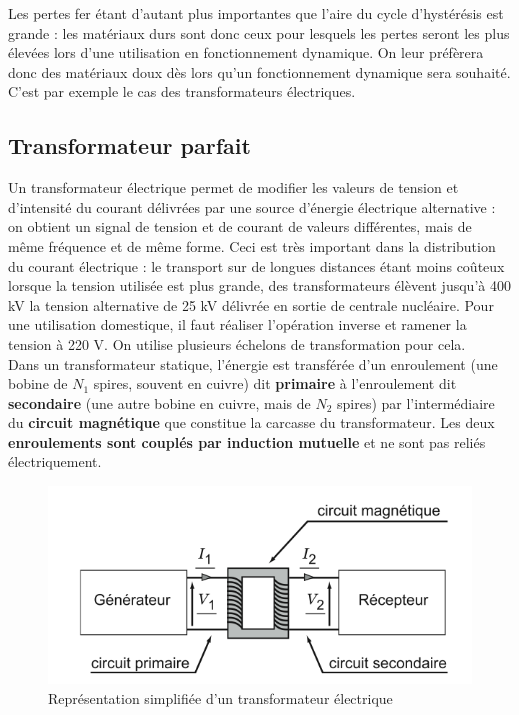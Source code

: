 \documentclass[11pt,a4paper]{report}
\begin{document}
Les pertes fer étant d'autant plus importantes que l'aire du cycle d'hystérésis est grande : les matériaux durs sont donc ceux pour lesquels les pertes seront les plus élevées lors d'une utilisation en fonctionnement dynamique. On leur préfèrera donc des matériaux doux dès lors qu'un fonctionnement dynamique sera souhaité. C'est par exemple le cas des transformateurs électriques.

\subsection{Transformateur parfait}

Un transformateur électrique permet de modifier les valeurs de tension et d'intensité du courant délivrées par une source d'énergie électrique alternative : on obtient un signal de tension et de courant de valeurs différentes, mais de même fréquence et de même forme. Ceci est très important dans la distribution du courant électrique : le transport sur de longues distances étant moins coûteux lorsque la tension utilisée est plus grande, des transformateurs élèvent jusqu'à 400 kV la tension alternative de 25 kV délivrée en sortie de centrale nucléaire. Pour une utilisation domestique, il faut réaliser l'opération inverse et ramener la tension à 220 V. On utilise plusieurs échelons de transformation pour cela.\\

Dans un transformateur statique, l'énergie est transférée d'un enroulement (une bobine de $N_1$ spires, souvent en cuivre) dit \textbf{primaire} à l'enroulement dit \textbf{secondaire} (une autre bobine en cuivre, mais de $N_2$ spires) par l'intermédiaire du \textbf{circuit magnétique} que constitue la carcasse du transformateur. Les deux \textbf{enroulements sont couplés par induction mutuelle} et ne sont pas reliés électriquement.

\begin{figure}[h!]
	\begin{center}
		\includegraphics[scale = 0.4]{transfo.png}
		\caption{Représentation simplifiée d'un transformateur électrique} 
		\label{fig:transfo}
	\end{center}
\end{figure}
\end{document}
